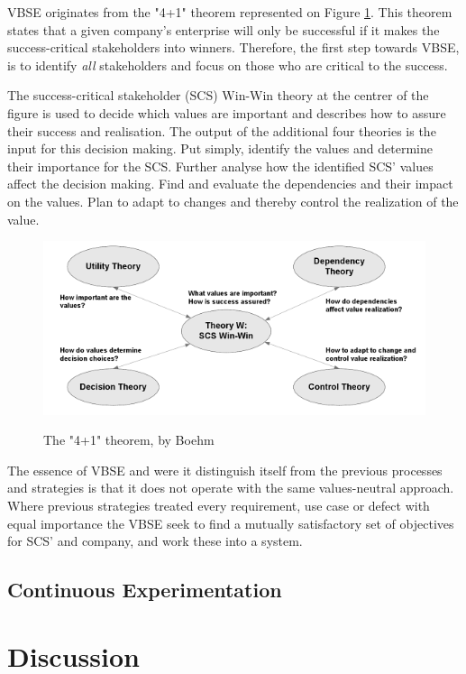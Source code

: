 \documentclass{sig-alternate}
\begin{document}
VBSE originates from the "4+1" theorem represented on Figure \ref{fig:fouronetheorem}. This theorem states that a given company's enterprise will only be successful if it makes the success-critical stakeholders into winners. Therefore, the first step towards VBSE, is to identify \textit{all} stakeholders and  focus on those who are critical to the success.

The success-critical stakeholder (SCS) Win-Win theory at the centrer of the figure is used to decide which values are important and describes how to assure their success and realisation. The output of the additional four theories is the input for this decision making. Put simply, identify the values and determine their importance for the SCS. Further analyse how the identified SCS' values affect the decision making. Find and evaluate the dependencies and their impact on the values. Plan to adapt to changes and thereby control the realization of the value.\cite{stefan:valuebased}

\begin{figure}
\centering
\caption{The "4+1" theorem, by Boehm}
\includegraphics[scale=0.6]{4+1theorem}
\label{fig:fouronetheorem}
\end{figure} 

The essence of VBSE and were it distinguish itself from the previous processes and strategies is that it does not operate with the same values-neutral approach. Where previous strategies treated every requirement, use case or defect with equal importance the VBSE seek to find a mutually satisfactory set of objectives for SCS' and company, and work these into a system.

\subsection{Continuous Experimentation}

\section{Discussion}
\end{document}
